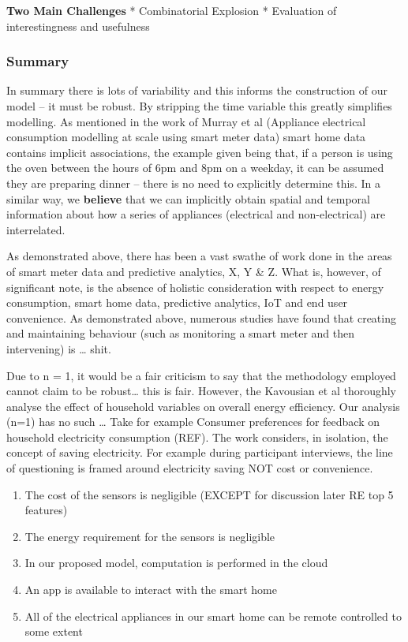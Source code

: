 \documentclass[11pt,]{article}
\providecommand{\tightlist}{%
  \setlength{\itemsep}{0pt}\setlength{\parskip}{0pt}}
\begin{document}
\textbf{Two Main Challenges} * Combinatorial Explosion * Evaluation of
interestingness and usefulness

\hypertarget{summary}{%
\subsubsection{Summary}\label{summary}}

In summary there is lots of variability and this informs the
construction of our model -- it must be robust. By stripping the time
variable this greatly simplifies modelling. As mentioned in the work of
Murray et al (Appliance electrical consumption modelling at scale using
smart meter data) smart home data contains implicit associations, the
example given being that, if a person is using the oven between the
hours of 6pm and 8pm on a weekday, it can be assumed they are preparing
dinner -- there is no need to explicitly determine this. In a similar
way, we \textbf{believe} that we can implicitly obtain spatial and
temporal information about how a series of appliances (electrical and
non-electrical) are interrelated.

As demonstrated above, there has been a vast swathe of work done in the
areas of smart meter data and predictive analytics, X, Y \& Z. What is,
however, of significant note, is the absence of holistic consideration
with respect to energy consumption, smart home data, predictive
analytics, IoT and end user convenience. As demonstrated above, numerous
studies have found that creating and maintaining behaviour (such as
monitoring a smart meter and then intervening) is \ldots{} shit.

Due to n = 1, it would be a fair criticism to say that the methodology
employed cannot claim to be robust\ldots{} this is fair. However, the
Kavousian et al thoroughly analyse the effect of household variables on
overall energy efficiency. Our analysis (n=1) has no such \ldots{} Take
for example Consumer preferences for feedback on household electricity
consumption (REF). The work considers, in isolation, the concept of
saving electricity. For example during participant interviews, the line
of questioning is framed around electricity saving NOT cost or
convenience.

\begin{enumerate}
\def\labelenumi{\arabic{enumi}.}
\tightlist
\item
  The cost of the sensors is negligible (EXCEPT for discussion later RE
  top 5 features)
\item
  The energy requirement for the sensors is negligible
\item
  In our proposed model, computation is performed in the cloud
\item
  An app is available to interact with the smart home
\item
  All of the electrical appliances in our smart home can be remote
  controlled to some extent
\end{enumerate}
\end{document}

